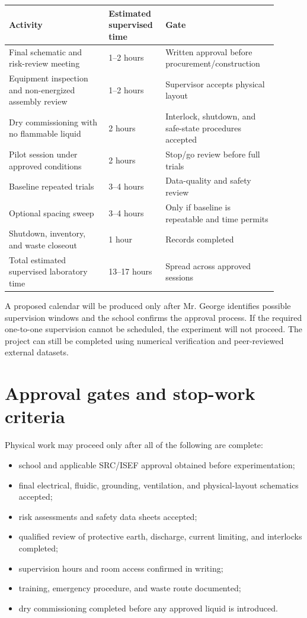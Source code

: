 \documentclass[11pt]{article}
\begin{document}
\begin{table}[h]
\centering
\small
\begin{tabular}{p{0.34\linewidth}p{0.18\linewidth}p{0.38\linewidth}}
\toprule
Activity & Estimated supervised time & Gate \\
\midrule
Final schematic and risk-review meeting & 1--2 hours & Written approval before procurement/construction \\
Equipment inspection and non-energized assembly review & 1--2 hours & Supervisor accepts physical layout \\
Dry commissioning with no flammable liquid & 2 hours & Interlock, shutdown, and safe-state procedures accepted \\
Pilot session under approved conditions & 2 hours & Stop/go review before full trials \\
Baseline repeated trials & 3--4 hours & Data-quality and safety review \\
Optional spacing sweep & 3--4 hours & Only if baseline is repeatable and time permits \\
Shutdown, inventory, and waste closeout & 1 hour & Records completed \\
\midrule
Total estimated supervised laboratory time & 13--17 hours & Spread across approved sessions \\
\bottomrule
\end{tabular}
\end{table}

A proposed calendar will be produced only after Mr. George identifies possible supervision windows and the school confirms the approval process. If the required one-to-one supervision cannot be scheduled, the experiment will not proceed. The project can still be completed using numerical verification and peer-reviewed external datasets.

\section{Approval gates and stop-work criteria}

Physical work may proceed only after all of the following are complete:
\begin{itemize}
    \item school and applicable SRC/ISEF approval obtained before experimentation;
    \item final electrical, fluidic, grounding, ventilation, and physical-layout schematics accepted;
    \item risk assessments and safety data sheets accepted;
    \item qualified review of protective earth, discharge, current limiting, and interlocks completed;
    \item supervision hours and room access confirmed in writing;
    \item training, emergency procedure, and waste route documented;
    \item dry commissioning completed before any approved liquid is introduced.
\end{itemize}
\end{document}
